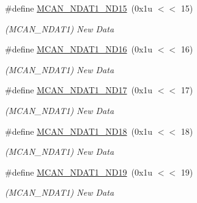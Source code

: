 \begin{DoxyCompactItemize}
\mbox{\label{group__SAME70__MCAN_ga542f9790bb3cf646a49028367c68c3a2}} 
\#define \mbox{\hyperlink{group__SAME70__MCAN_ga542f9790bb3cf646a49028367c68c3a2}{M\+C\+A\+N\+\_\+\+N\+D\+A\+T1\+\_\+\+N\+D15}}~(0x1u $<$$<$ 15)
\begin{DoxyCompactList}\small\item\em (M\+C\+A\+N\+\_\+\+N\+D\+A\+T1) New Data \end{DoxyCompactList}\item 
\mbox{\label{group__SAME70__MCAN_ga22f1da0d47584205fdd6b39385d12422}} 
\#define \mbox{\hyperlink{group__SAME70__MCAN_ga22f1da0d47584205fdd6b39385d12422}{M\+C\+A\+N\+\_\+\+N\+D\+A\+T1\+\_\+\+N\+D16}}~(0x1u $<$$<$ 16)
\begin{DoxyCompactList}\small\item\em (M\+C\+A\+N\+\_\+\+N\+D\+A\+T1) New Data \end{DoxyCompactList}\item 
\mbox{\label{group__SAME70__MCAN_ga2bb124ada6a7ca09aec0064e7db92733}} 
\#define \mbox{\hyperlink{group__SAME70__MCAN_ga2bb124ada6a7ca09aec0064e7db92733}{M\+C\+A\+N\+\_\+\+N\+D\+A\+T1\+\_\+\+N\+D17}}~(0x1u $<$$<$ 17)
\begin{DoxyCompactList}\small\item\em (M\+C\+A\+N\+\_\+\+N\+D\+A\+T1) New Data \end{DoxyCompactList}\item 
\mbox{\label{group__SAME70__MCAN_gae6550ddc142cb819dc0e1e0fbcb39a3d}} 
\#define \mbox{\hyperlink{group__SAME70__MCAN_gae6550ddc142cb819dc0e1e0fbcb39a3d}{M\+C\+A\+N\+\_\+\+N\+D\+A\+T1\+\_\+\+N\+D18}}~(0x1u $<$$<$ 18)
\begin{DoxyCompactList}\small\item\em (M\+C\+A\+N\+\_\+\+N\+D\+A\+T1) New Data \end{DoxyCompactList}\item 
\mbox{\label{group__SAME70__MCAN_gad55ec946e9b4953d1c50e4c53ff73032}} 
\#define \mbox{\hyperlink{group__SAME70__MCAN_gad55ec946e9b4953d1c50e4c53ff73032}{M\+C\+A\+N\+\_\+\+N\+D\+A\+T1\+\_\+\+N\+D19}}~(0x1u $<$$<$ 19)
\begin{DoxyCompactList}\small\item\em (M\+C\+A\+N\+\_\+\+N\+D\+A\+T1) New Data \end{DoxyCompactList}\item 
$$
\end{DoxyCompactItemize}
